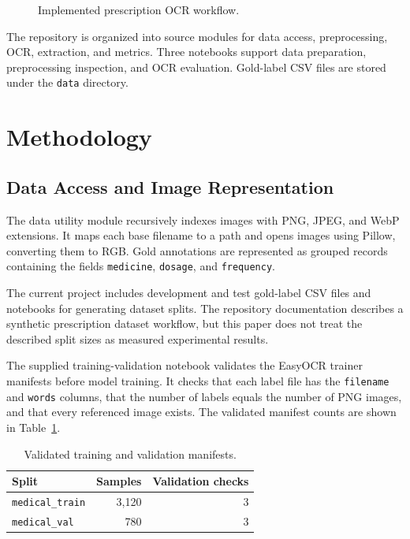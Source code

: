 \documentclass[conference]{IEEEtran}
\begin{document}
\begin{figure}[t]
\centering
{}
\caption{Implemented prescription OCR workflow.}
\label{fig:pipeline}
\end{figure}

The repository is organized into source modules for data access, preprocessing,
OCR, extraction, and metrics. Three notebooks support data preparation,
preprocessing inspection, and OCR evaluation. Gold-label CSV files are stored
under the \texttt{data} directory.

\section{Methodology}
\label{sec:methodology}

\subsection{Data Access and Image Representation}
\label{sec:data}

The data utility module recursively indexes images with PNG, JPEG, and WebP
extensions. It maps each base filename to a path and opens images using
Pillow, converting them to RGB. Gold annotations are represented as grouped
records containing the fields \texttt{medicine}, \texttt{dosage}, and
\texttt{frequency}.

The current project includes development and test gold-label CSV files and
notebooks for generating dataset splits. The repository documentation describes
a synthetic prescription dataset workflow, but this paper does not treat the
described split sizes as measured experimental results.

The supplied training-validation notebook validates the EasyOCR trainer
manifests before model training. It checks that each label file has the
\texttt{filename} and \texttt{words} columns, that the number of labels equals
the number of PNG images, and that every referenced image exists. The validated
manifest counts are shown in Table~\ref{tab:dataset}.

\begin{table}[t]
\centering
\caption{Validated training and validation manifests.}
\label{tab:dataset}
\begin{tabular}{lrr}
\hline
\textbf{Split} & \textbf{Samples} & \textbf{Validation checks}\\
\hline
\texttt{medical\_train} & 3,120 & 3\\
\texttt{medical\_val} & 780 & 3\\
\hline
\end{tabular}
\end{table}
\end{document}
